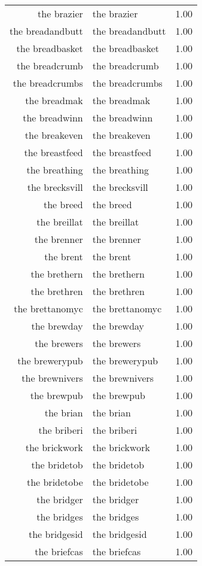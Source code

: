 \begin{table}[ht]
\begin{tabular}{rlr}
  the brazier & the brazier & 1.00 \\ 
  the breadandbutt & the breadandbutt & 1.00 \\ 
  the breadbasket & the breadbasket & 1.00 \\ 
  the breadcrumb & the breadcrumb & 1.00 \\ 
  the breadcrumbs & the breadcrumbs & 1.00 \\ 
  the breadmak & the breadmak & 1.00 \\ 
  the breadwinn & the breadwinn & 1.00 \\ 
  the breakeven & the breakeven & 1.00 \\ 
  the breastfeed & the breastfeed & 1.00 \\ 
  the breathing & the breathing & 1.00 \\ 
  the brecksvill & the brecksvill & 1.00 \\ 
  the breed & the breed & 1.00 \\ 
  the breillat & the breillat & 1.00 \\ 
  the brenner & the brenner & 1.00 \\ 
  the brent & the brent & 1.00 \\ 
  the brethern & the brethern & 1.00 \\ 
  the brethren & the brethren & 1.00 \\ 
  the brettanomyc & the brettanomyc & 1.00 \\ 
  the brewday & the brewday & 1.00 \\ 
  the brewers & the brewers & 1.00 \\ 
  the brewerypub & the brewerypub & 1.00 \\ 
  the brewnivers & the brewnivers & 1.00 \\ 
  the brewpub & the brewpub & 1.00 \\ 
  the brian & the brian & 1.00 \\ 
  the briberi & the briberi & 1.00 \\ 
  the brickwork & the brickwork & 1.00 \\ 
  the bridetob & the bridetob & 1.00 \\ 
  the bridetobe & the bridetobe & 1.00 \\ 
  the bridger & the bridger & 1.00 \\ 
  the bridges & the bridges & 1.00 \\ 
  the bridgesid & the bridgesid & 1.00 \\ 
  the briefcas & the briefcas & 1.00 \\ 

\end{tabular}
\end{table}
